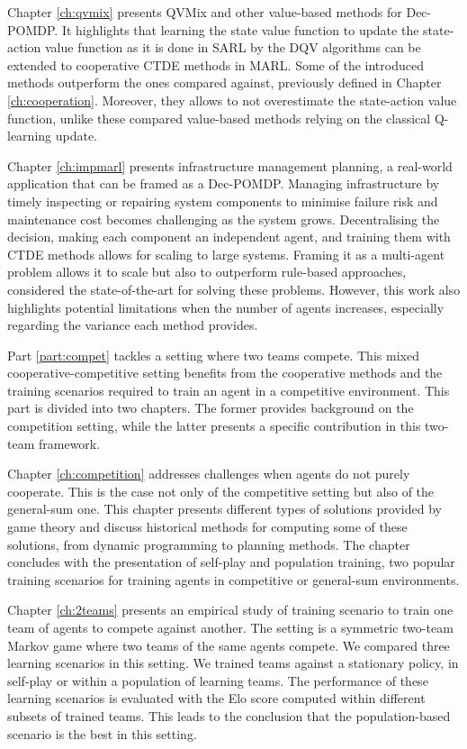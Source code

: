 Chapter \ref{ch:qvmix} presents QVMix and other value-based methods for Dec-POMDP.
It highlights that learning the state value function to update the state-action value function as it is done in SARL by the DQV algorithms can be extended to cooperative CTDE methods in MARL.
Some of the introduced methods outperform the ones compared against, previously defined in Chapter \ref{ch:cooperation}.
Moreover, they allows to not overestimate the state-action value function, unlike these compared value-based methods relying on the classical Q-learning update.

Chapter \ref{ch:impmarl} presents infrastructure management planning, a real-world application that can be framed as a Dec-POMDP.
Managing infrastructure by timely inspecting or repairing system components to minimise failure risk and maintenance cost becomes challenging as the system grows.
Decentralising the decision, making each component an independent agent, and training them with CTDE methods allows for scaling to large systems.
Framing it as a multi-agent problem allows it to scale but also to outperform rule-based approaches, considered the state-of-the-art for solving these problems.
However, this work also highlights potential limitations when the number of agents increases, especially regarding the variance each method provides.

Part \ref{part:compet} tackles a setting where two teams compete.
This mixed cooperative-competitive setting benefits from the cooperative methods and the training scenarios required to train an agent in a competitive environment.
This part is divided into two chapters.
The former provides background on the competition setting, while the latter presents a specific contribution in this two-team framework.

Chapter \ref{ch:competition} addresses challenges when agents do not purely cooperate.
This is the case not only of the competitive setting but also of the general-sum one.
This chapter presents different types of solutions provided by game theory and discuss historical methods for computing some of these solutions, from dynamic programming to planning methods.
The chapter concludes with the presentation of self-play and population training, two popular training scenarios for training agents in competitive or general-sum environments.

Chapter \ref{ch:2teams} presents an empirical study of training scenario to train one team of agents to compete against another.
The setting is a symmetric two-team Markov game where two teams of the same agents compete.
We compared three learning scenarios in this setting.
We trained teams against a stationary policy, in self-play or within a population of learning teams.
The performance of these learning scenarios is evaluated with the Elo score computed within different subsets of trained teams.
This leads to the conclusion that the population-based scenario is the best in this setting.

